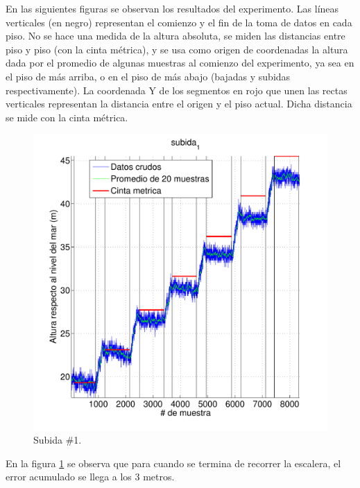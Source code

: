 \documentclass[main]{subfiles}
\begin{document}
En las siguientes figuras se observan los resultados del experimento. Las líneas verticales (en negro) representan el comienzo y el fin de la toma de datos en cada piso. No se hace una medida de la altura absoluta, se miden las distancias entre piso y piso (con la cinta métrica), y se usa como origen de coordenadas la altura dada por el promedio de algunas muestras al comienzo del experimento, ya sea en el piso de más arriba, o en el piso de más abajo (bajadas y subidas respectivamente). La coordenada Y de los segmentos en rojo que unen las rectas verticales representan la distancia entre el origen y el piso actual. Dicha distancia se mide con la cinta métrica.

\vspace{-12pt}
\begin{figure}[h!]
\centering
  \includegraphics[width=.80\textwidth]{./pics_barom/metros-s1.pdf}
\vspace{-15pt}
  \caption{Subida \#1.}
  \label{fig:metros-s1.pdf}
\end{figure}
\vspace{-15pt}

En la figura \ref{fig:metros-s1.pdf} se observa que para cuando se termina de recorrer la escalera, el error acumulado se llega a los 3 metros.
\end{document}
